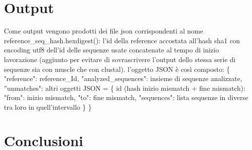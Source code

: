 \documentclass[12pt]{article}
\begin{document}
\section{Output}	
	Come output vengono prodotti dei file json corrispondenti al nome reference\_seq\_hash.hexdigest(): l'id della reference accostata all'hash sha1 con encoding utf8 dell'id delle sequenze usate concatenate al tempo di inizio lavorazione (aggiunto per evitare di sovrascrivere l'output dello stessa serie di sequenze sia con muscle che con clustal).\newline
	l'oggetto JSON è così composto: \{ "reference": reference\_Id, \newline "analyzed\_sequences": insieme di sequenze analizzate, \newline
 	''unmatches": altri oggetti JSON = \newline\{ id (hash inizio mismatch + fine mismatch): "from": inizio mismatch, \newline
   "to": fine mismatch, \newline
   "sequences": lista sequenze in diverse tra loro in quell'intervallo \} \newline
 \}
\section{Conclusioni}
\end{document}
